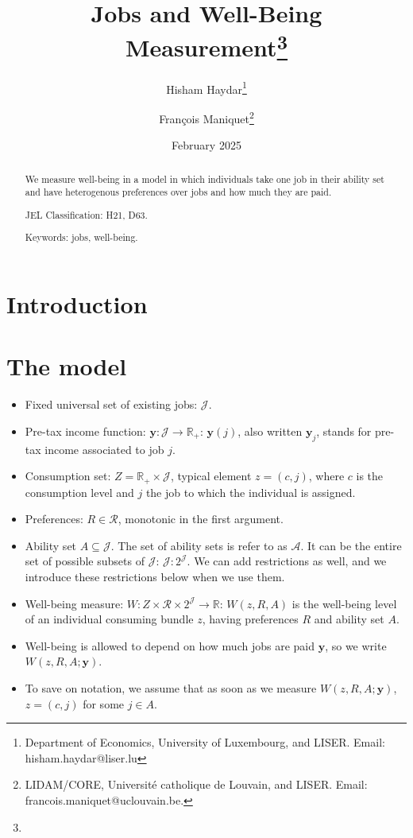 \documentclass[12pt,thmsb]{article}
\begin{document}
\title{Jobs and Well-Being Measurement\thanks{}}
\author{Hisham Haydar\thanks{Department of Economics, University of Luxembourg, and LISER. Email: hisham.haydar@liser.lu} \and Fran\c{c}ois Maniquet\thanks{LIDAM/CORE, Universit\'{e} catholique de Louvain, and LISER. Email: francois.maniquet@uclouvain.be.}}
\date{February 2025}
\maketitle

\begin{abstract}
We measure well-being in a model in which individuals take one job in their ability set and have heterogenous preferences over jobs and how much they are paid.

JEL Classification: H21, D63.

Keywords: jobs, well-being.
\end{abstract}

\section{Introduction}

\section{The model}

\begin{itemize}
    \item Fixed universal set of existing jobs: $\mathcal{J}$.
    \item Pre-tax income function: $\mathbf{y}:\mathcal{J}\rightarrow \mathbb{R}_{+}$: $\mathbf{y}(j)$, also written $\mathbf{y}_j$, stands for pre-tax income associated to job $j$.
    \item Consumption set: $Z=\mathbb{R}_{+}\times \mathcal{J}$, typical element $z=(c,j)$, where $c$ is the consumption level and $j$ the job to which the individual is assigned.
    \item Preferences: $R\in\mathcal{R}$, monotonic in the first argument.
    \item Ability set $A\subseteq \mathcal{J}$. The set of ability sets is refer to as $\mathcal{A}$. It can be the entire set of possible subsets of $\mathcal{J}$: $\mathcal{J}:2^{\mathcal{J}}$. We can add restrictions as well, and we introduce these restrictions below when we use them.
    \item Well-being measure: $W: Z\times \mathcal{R} \times 2^{\mathcal{J}}\rightarrow \mathbb{R}$: $W(z,R,A)$ is the well-being level of an individual consuming bundle $z$, having preferences $R$ and ability set $A$.
    \item Well-being is allowed to depend on how much jobs are paid $\mathbf{y}$, so we write $W(z,R,A;\mathbf{y})$.
    \item To save on notation, we assume that as soon as we measure $W(z,R,A;\mathbf{y})$, $z=(c,j)$ for some $j\in A$.
\end{itemize}
\end{document}
